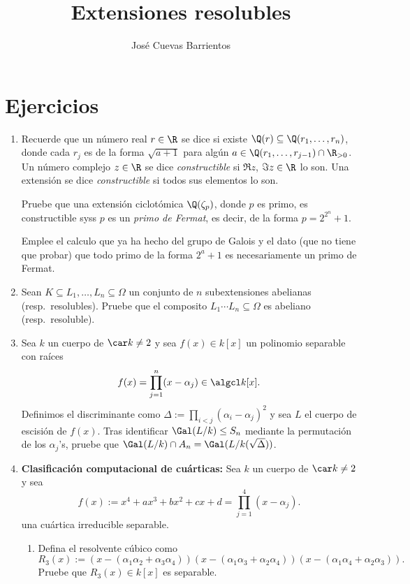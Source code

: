 \documentclass[11pt, reqno]{amsart}
\title{Extensiones resolubles}
\date{\DTMdate{2025-09-03}}
\author{José Cuevas Barrientos}
\begin{document}
\maketitle

\section{Ejercicios}
\begin{enumerate}
	\item Recuerde que un número real $r \in \R$ se dice  si existe $\Q(r) \subseteq \Q(r_1,
		\dots, r_n)$, donde cada $r_j$ es de la forma $\sqrt{a + 1}$ para algún $a \in \Q(r_1, \dots, r_{j-1}) \cap \R_{>0}$.
		Un número complejo $z \in \R$ se dice \emph{constructible} si $\Re z$, $\Im z \in \R$ lo son.
		Una extensión se dice \emph{constructible} si todos sus elementos lo son.

		Pruebe que una extensión ciclotómica $\Q(\zeta_p)$, donde $p$ es primo, es constructible syss $p$ es un \emph{primo de
		Fermat}, es decir, de la forma $p = 2^{2^n} + 1$.

		\begin{additional}
			\begin{hint}
				Emplee el calculo que ya ha hecho del grupo de Galois y el dato (que no tiene que probar) que todo primo de la forma
				$2^a + 1$ es necesariamente un primo de Fermat.
			\end{hint}
		\end{additional}
		\nocite{jacobson:basic}

		\newex
	\item Sean $K \subseteq L_1, \dots, L_n \subseteq \Omega$ un conjunto de $n$ subextensiones abelianas (resp.\ resolubles).
		Pruebe que el composito $L_1 \cdots L_n \subseteq \Omega$ es abeliano (resp.\ resoluble).

		\newex
	\item Sea $k$ un cuerpo de $\car k \ne 2$ y sea $f(x) \in k[x]$ un polinomio separable con raíces
		\[
			f(x) = \prod_{j=1}^{n} (x - \alpha_j) \in \algcl k[x].
		\]
		Definimos el discriminante como $\Delta := \prod_{i < j} (\alpha_i - \alpha_j)^2$ y sea $L$ el cuerpo de escisión de $f(x)$.
		Tras identificar $\Gal(L/k) \le S_n$ mediante la permutación de los $\alpha_j$'s, pruebe que $\Gal(L/k) \cap A_n = \Gal(L/k(\sqrt{\Delta}))$.

		\newex
	\item\label{ex:quartic_comp} \textbf{Clasificación computacional de cuárticas:}
		Sea $k$ un cuerpo de $\car k \ne 2$ y sea
		\[
			f(x) := x^4 + ax^3 + bx^2 + cx + d = \prod_{j=1}^{4} (x - \alpha_j).
		\]
		una cuártica irreducible separable.
		\begin{enumerate}
			\item Defina el resolvente cúbico como
				\begin{equation*}
					R_3(x) := (x - (\alpha_1\alpha_2 + \alpha_3\alpha_4))(x - (\alpha_1\alpha_3 + \alpha_2\alpha_4))(x -
					(\alpha_1\alpha_4 + \alpha_2\alpha_3)).
				\end{equation*}
				Pruebe que $R_3(x) \in k[x]$ es separable.


\end{enumerate}
\end{enumerate}
\end{document}

